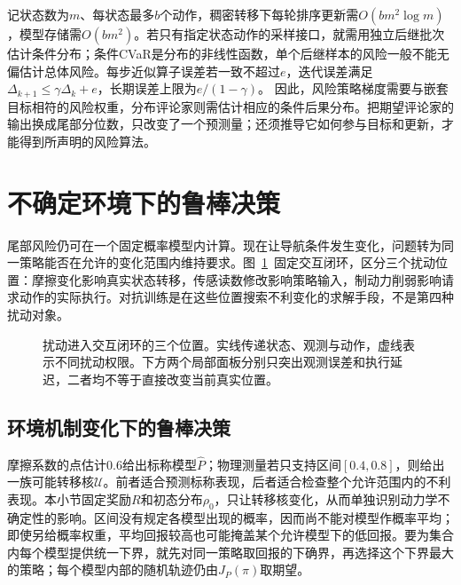 记状态数为$m$、每状态最多$b$个动作，稠密转移下每轮排序更新需$O(bm^2\log m)$，模型存储需$O(bm^2)$。若只有指定状态动作的采样接口，就需用独立后继批次估计条件分布；条件CVaR是分布的非线性函数，单个后继样本的风险一般不能无偏估计总体风险。每步近似算子误差若一致不超过$e$，迭代误差满足
$\Delta_{k+1}\leq\gamma\Delta_k+e$，长期误差上限为$e/(1-\gamma)$。
因此，风险策略梯度需要与嵌套目标相符的风险权重，分布评论家则需估计相应的条件后果分布。把期望评论家的输出换成尾部分位数，只改变了一个预测量；还须推导它如何参与目标和更新，才能得到所声明的风险算法。

\section{不确定环境下的鲁棒决策}
\label{sec:rl-trustworthy-robust}

尾部风险仍可在一个固定概率模型内计算。现在让导航条件发生变化，问题转为同一策略能否在允许的变化范围内维持要求。图~\ref{fig:rl-trustworthy-channels}~固定交互闭环，区分三个扰动位置：摩擦变化影响真实状态转移，传感读数修改影响策略输入，制动力削弱影响请求动作的实际执行。对抗训练是在这些位置搜索不利变化的求解手段，不是第四种扰动对象。

\begin{figure}[t]
  \centering
  
  \caption{扰动进入交互闭环的三个位置。实线传递状态、观测与动作，虚线表示不同扰动权限。下方两个局部面板分别只突出观测误差和执行延迟，二者均不等于直接改变当前真实位置。}
  \label{fig:rl-trustworthy-channels}
\end{figure}

\subsection{环境机制变化下的鲁棒决策}
\label{sec:rl-trustworthy-mechanism}

摩擦系数的点估计0.6给出标称模型$\widehat P$；物理测量若只支持区间$[0.4,0.8]$，则给出一族可能转移核$\mathcal U$。前者适合预测标称表现，后者适合检查整个允许范围内的不利表现。本小节固定奖励$R$和初态分布$\rho_0$，只让转移核变化，从而单独识别动力学不确定性的影响。区间没有规定各模型出现的概率，因而尚不能对模型作概率平均；即使另给概率权重，平均回报较高也可能掩盖某个允许模型下的低回报。要为集合内每个模型提供统一下界，就先对同一策略取回报的下确界，再选择这个下界最大的策略；每个模型内部的随机轨迹仍由$J_P(\pi)$取期望。

